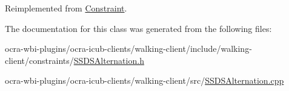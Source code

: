 \-Reimplemented from \hyperlink{classConstraint_a07453509c3f0f95034db965c9e699810}{\-Constraint}.



\-The documentation for this class was generated from the following files\-:\begin{DoxyCompactItemize}
\item 
ocra-\/wbi-\/plugins/ocra-\/icub-\/clients/walking-\/client/include/walking-\/client/constraints/\hyperlink{SSDSAlternation_8h}{\-S\-S\-D\-S\-Alternation.\-h}\item 
ocra-\/wbi-\/plugins/ocra-\/icub-\/clients/walking-\/client/src/\hyperlink{SSDSAlternation_8cpp}{\-S\-S\-D\-S\-Alternation.\-cpp}\end{DoxyCompactItemize}
